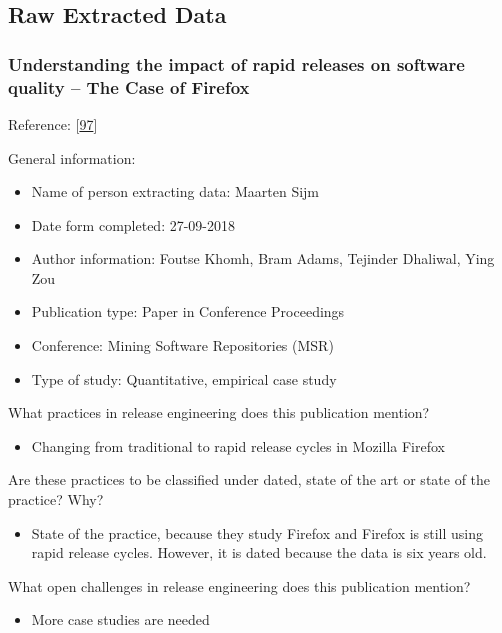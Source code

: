 \documentclass[]{book}
\providecommand{\tightlist}{%
  \setlength{\itemsep}{0pt}\setlength{\parskip}{0pt}}
\begin{document}
\subsection{Raw Extracted Data}\label{raw-extracted-data}

\subsubsection{Understanding the impact of rapid releases on software
quality -- The Case of
Firefox}\label{understanding-the-impact-of-rapid-releases-on-software-quality-the-case-of-firefox}

Reference: {[}\protect\hyperlink{ref-khomh2015a}{97}{]}

General information:

\begin{itemize}
\tightlist
\item
  Name of person extracting data: Maarten Sijm
\item
  Date form completed: 27-09-2018
\item
  Author information: Foutse Khomh, Bram Adams, Tejinder Dhaliwal, Ying
  Zou
\item
  Publication type: Paper in Conference Proceedings
\item
  Conference: Mining Software Repositories (MSR)
\item
  Type of study: Quantitative, empirical case study
\end{itemize}

What practices in release engineering does this publication mention?

\begin{itemize}
\tightlist
\item
  Changing from traditional to rapid release cycles in Mozilla Firefox
\end{itemize}

Are these practices to be classified under dated, state of the art or
state of the practice? Why?

\begin{itemize}
\tightlist
\item
  State of the practice, because they study Firefox and Firefox is still
  using rapid release cycles. However, it is dated because the data is
  six years old.
\end{itemize}

What open challenges in release engineering does this publication
mention?

\begin{itemize}
\tightlist
\item
  More case studies are needed
\end{itemize}
\end{document}
